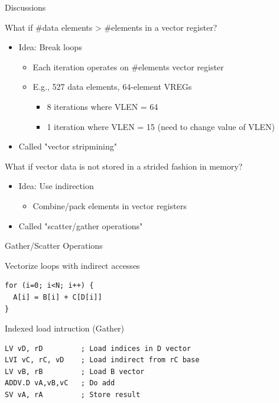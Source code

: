 \documentclass[presentation]{beamer}
\begin{document}
\begin{frame}[label={sec:orgb2b8259}]{Discussions}
\begin{block}{What if \#data elements > \#elements in a vector register?}
\pause
\begin{itemize}
\item Idea: Break loops
\begin{itemize}
\item Each iteration operates on \#elements vector register
\item E.g., 527 data elements, 64-element VREGs
\begin{itemize}
\item 8 iterations where VLEN = 64
\item 1 iteration where VLEN = 15 (need to change value of VLEN)
\end{itemize}
\end{itemize}
\end{itemize}
\pause
\begin{itemize}
\item Called \alert{"vector stripmining"}
\end{itemize}
\pause
\end{block}

\begin{block}{What if vector data is not stored in a strided fashion in memory?}
\pause

\begin{itemize}
\item Idea: Use indirection
\begin{itemize}
\item Combine/pack elements in vector registers
\end{itemize}
\item Called \alert{"scatter/gather operations"}
\end{itemize}
\end{block}
\end{frame}


\begin{frame}[label={sec:orgcb1d60b},fragile]{Gather/Scatter Operations}
 \begin{block}{Vectorize loops with indirect accesses}
\lstset{language=C,label= ,caption= ,captionpos=b,numbers=none}
\begin{lstlisting}
for (i=0; i<N; i++) {
  A[i] = B[i] + C[D[i]]
}
\end{lstlisting}
\end{block}
\begin{block}{Indexed load intruction (Gather)}
\lstset{language=asm,label= ,caption= ,captionpos=b,numbers=none}
\begin{lstlisting}
LV vD, rD         ; Load indices in D vector
LVI vC, rC, vD    ; Load indirect from rC base
LV vB, rB         ; Load B vector
ADDV.D vA,vB,vC   ; Do add
SV vA, rA         ; Store result
\end{lstlisting}
\end{block}
\end{frame}
\end{document}
